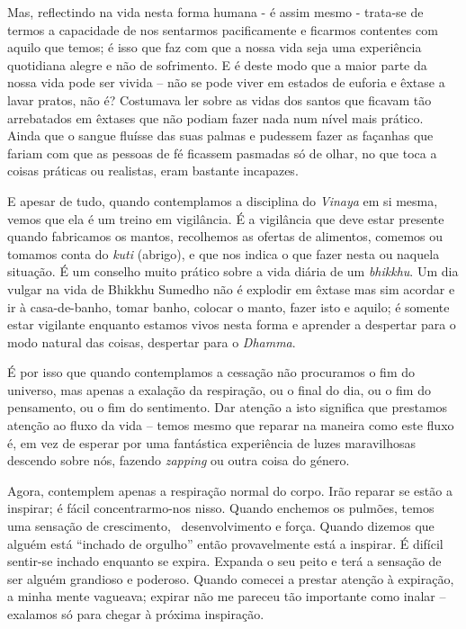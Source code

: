 Mas, reflectindo na vida nesta forma humana - é assim mesmo - trata-se
de termos a capacidade de nos sentarmos pacificamente e ficarmos
contentes com aquilo que temos; é isso que faz com que a nossa vida seja
uma experiência quotidiana alegre e não de sofrimento. E é deste modo
que a maior parte da nossa vida pode ser vivida -- não se pode viver em
estados de euforia e êxtase a lavar pratos, não é? Costumava ler sobre
as vidas dos santos que ficavam tão arrebatados em êxtases que não
podiam fazer nada num nível mais prático. Ainda que o sangue fluísse das
suas palmas e pudessem fazer as façanhas que fariam com que as pessoas
de fé ficassem pasmadas só de olhar, no que toca a coisas práticas ou
realistas, eram bastante incapazes.

E apesar de tudo, quando contemplamos a disciplina do \emph{Vinaya} em
si mesma, vemos que ela é um treino em vigilância. É a vigilância que
deve estar presente quando fabricamos os mantos, recolhemos as ofertas
de alimentos, comemos ou tomamos conta do \emph{kuti} (abrigo), e que
nos indica o que fazer nesta ou naquela situação. É um conselho muito
prático sobre a vida diária de um \emph{bhikkhu}. Um dia vulgar na vida
de Bhikkhu Sumedho não é explodir em êxtase mas sim acordar e ir à
casa-de-banho, tomar banho, colocar o manto, fazer isto e aquilo; é
somente estar vigilante enquanto estamos vivos nesta forma e aprender a
despertar para o modo natural das coisas, despertar para o
\emph{Dhamma}.

É por isso que quando contemplamos a cessação não procuramos o fim do
universo, mas apenas a exalação da respiração, ou o final do dia, ou o
fim do pensamento, ou o fim do sentimento. Dar atenção a isto significa
que prestamos atenção ao fluxo da vida -- temos mesmo que reparar na
maneira como este fluxo é, em vez de esperar por uma fantástica
experiência de luzes maravilhosas descendo sobre nós, fazendo
\emph{zapping} ou outra coisa do género.

Agora, contemplem apenas a respiração normal do corpo. Irão reparar se
estão a inspirar; é fácil concentrarmo-nos nisso. Quando enchemos os
pulmões, temos uma sensação de crescimento, ~desenvolvimento e força.
Quando dizemos que alguém está ``inchado de orgulho'' então
provavelmente está a inspirar. É difícil sentir-se inchado enquanto se
expira. Expanda o seu peito e terá a sensação de ser alguém grandioso e
poderoso. Quando comecei a prestar atenção à expiração, a minha mente
vagueava; expirar não me pareceu tão importante como inalar -- exalamos
só para chegar à próxima inspiração.

